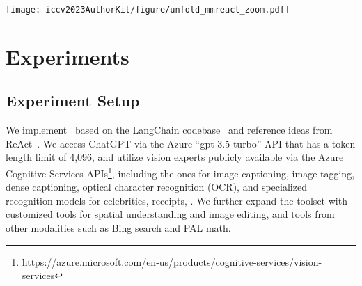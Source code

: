 \begin{figure*}[t]
\centering
\vspace{-10mm}
\texttt{[image: iccv2023AuthorKit/figure/unfold\_mmreact\_zoom.pdf]}
\vspace{-1ex}
\caption{An example of \modelname's full execution flow. The blue circles with numbered indices indicate the order in which different models are called (\ie, the executions). The executions, highlighted by bold underlined text, can be either a ChatGPT call (\eg, ``\textbf{\underline{ChatGPT:}}'') or running one or multiple selected vision experts (\eg, ``\textbf{\underline{Image Captioning}}''). We add a commentary text \textit{action execution} in dashed boxes to help understand the expert execution. Each ChatGPT execution takes the preceding text as input and generates the text leading up to the next execution (\eg, \textit{``This is an image. Assistant, what  image? \textless ImagePath\textgreater''} for Execution~1).
Texts in gray represent \modelname's thoughts or vision experts' actions and outputs, which are invisible to users. This multimodal reasoning and action process occurs behind the scene to gather the necessary information for generating final responses to users, which are shown in black.
	}
\label{fig:prompt}
\end{figure*}

\section{Experiments}
\subsection{Experiment Setup}
We implement \modelname~based on the LangChain codebase~\cite{langchain} and reference ideas from ReAct~\cite{yao2022react}. We access ChatGPT via the Azure ``gpt-3.5-turbo'' API that has a token length limit of 4,096, and utilize vision experts publicly available via the Azure Cognitive Services APIs\footnote{\url{https://azure.microsoft.com/en-us/products/cognitive-services/vision-services}}, including the ones for image captioning,
image tagging, dense captioning, optical character recognition (OCR), and specialized recognition models for celebrities, receipts, \etc. We further expand the toolset with customized tools for spatial understanding and image editing, and tools from other modalities such as Bing search and PAL math.

